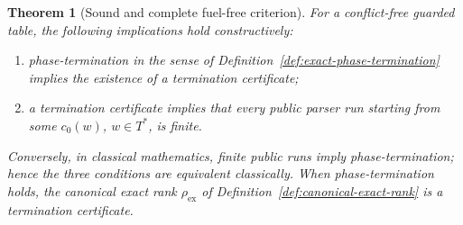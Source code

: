 \documentclass[11pt,a4paper]{article}
\theoremstyle{prettyplain}
\newtheorem{theorem}{Theorem}
\theoremstyle{prettydef}
\begin{document}
\begin{theorem}[Sound and complete fuel-free criterion]\label{thm:exact-termination-criterion}
For a conflict-free guarded table, the following implications hold
constructively:
\begin{enumerate}
\item[(a)] phase-termination in the sense of
Definition~\ref{def:exact-phase-termination} implies the existence of a
termination certificate;
\item[(b)] a termination certificate implies that every public parser run
starting from some \(c_0(w)\), \(w\in T^*\), is finite.
\end{enumerate}
Conversely, in classical mathematics, finite public runs imply
phase-termination; hence the three conditions are equivalent classically.  When
phase-termination holds, the canonical exact rank \(\rho_{\mathrm{ex}}\) of
Definition~\ref{def:canonical-exact-rank} is a termination certificate.
\end{theorem}
\end{document}
